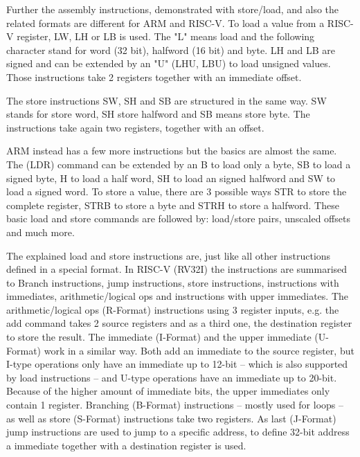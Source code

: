 \documentclass[conference]{IEEEtran}
\begin{document}
	Further the assembly instructions, demonstrated with store/load, and also the related formats are different for ARM and RISC-V.
	To load a value from a RISC-V register, LW, LH or LB is used. The "L" means load and the following character stand for word (32 bit), halfword (16 bit) and byte. LH and LB are signed and can be extended by an "U" (LHU, LBU) to load unsigned values. Those instructions take 2 registers together with an immediate offset. \cite[page 18f]{Waterman2017}

	The store instructions SW, SH and SB are structured in the same way. SW stands for store word, SH store halfword and SB means store byte. The instructions take again two registers, together with an offset.  \cite[slide 30ff]{Berkeley2019} 

	ARM instead has a few more instructions but the basics are almost the same. The (LDR) command can be extended by an B to load only a byte, SB to load a signed byte, H to load a half word, SH to load an signed halfword and SW to load a signed word. To store a value, there are 3 possible ways STR to store the complete register, STRB to store a byte and STRH to store a halfword. These basic load and store commands are followed by: load/store pairs, unscaled offsets and much more. \cite[page 207 - 218]{Arm2020}

	The explained load and store instructions are, just like all other instructions defined in a special format.
	In RISC-V (RV32I) the instructions are summarised to Branch instructions, jump instructions, store instructions, instructions with immediates, arithmetic/logical ops and instructions with upper immediates.
	The arithmetic/logical ops (R-Format) instructions using 3 register inputs, e.g. the add command takes 2 source registers and as a third one, the destination register to store the result.
	The immediate (I-Format) and the upper immediate (U-Format) work in a similar way. Both add an immediate to the source register, but I-type operations only have an immediate up to 12-bit -- which is also supported by load instructions -- and U-type operations have an immediate up to 20-bit. Because of the higher amount of immediate bits, the upper immediates only contain 1 register. Branching (B-Format) instructions -- mostly used for loops -- as well as store (S-Format) instructions take two registers. As last (J-Format) jump instructions are used to jump to a specific address, to define 32-bit address a immediate together with a destination register is used. \cite[slide 10 -64]{Ho}
	
\end{document}
